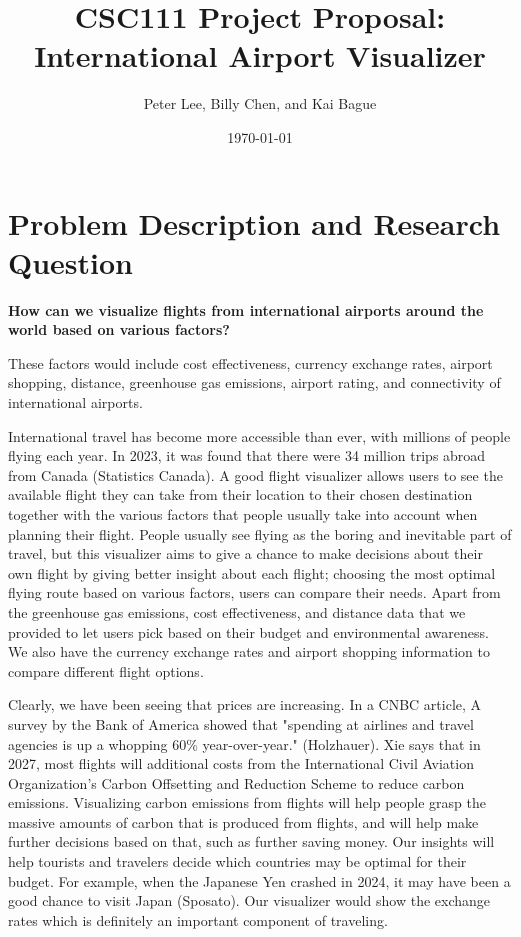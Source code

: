 \documentclass[fontsize=11pt]{article}
\title{CSC111 Project Proposal: International Airport Visualizer}
\author{Peter Lee, Billy Chen, and Kai Bague}
\date{\today}
\begin{document}
\maketitle

\section*{Problem Description and Research Question}
\begingroup
    \setlength{\parskip}{1em}  %
    
    \textbf{How can we visualize flights from international airports around the world based on various factors?}
    
    These factors would include cost effectiveness, currency exchange rates, airport shopping, distance, greenhouse gas emissions, airport rating, and connectivity of international airports.
    
    International travel has become more accessible than ever, with millions of people flying each year. In 2023, it was found that there were 34 million trips abroad from Canada (Statistics Canada). A good flight visualizer allows users to see the available flight they can take from their location to their chosen destination together with the various factors that people usually take into account when planning their flight. People usually see flying as the boring and inevitable part of travel, but this visualizer aims to give a chance to make decisions about their own flight by giving better insight about each flight; choosing the most optimal flying route based on various factors, users can compare their needs. Apart from the greenhouse gas emissions, cost effectiveness, and distance data that we provided to let users pick based on their budget and environmental awareness. We also have the currency exchange rates and airport shopping information to compare different flight options.

    Clearly, we have been seeing that prices are increasing. In a CNBC article, A survey by the Bank of America showed that "spending at airlines and travel agencies is up a whopping 60\% year-over-year." (Holzhauer). Xie says that in 2027, most flights will additional costs from the International Civil Aviation Organization’s Carbon Offsetting and Reduction Scheme to reduce carbon emissions. Visualizing carbon emissions from flights will help people grasp the massive amounts of carbon that is produced from flights, and will help make further decisions based on that, such as further saving money. Our insights will help tourists and travelers decide which countries may be optimal for their budget. For example, when the Japanese Yen crashed in 2024, it may have been a good chance to visit Japan (Sposato). Our visualizer would show the exchange rates which is definitely an important component of traveling.
    
\end{document}

